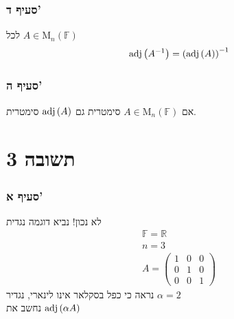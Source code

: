 \documentclass[12pt, titlepage]{article}
\begin{document}
\section*{סעיף ד'}
לכל $A\in \mathrm{M}_n\left(\mathbb{F}\right)$
\[
    \mathrm{adj}\left(A^{-1}\right) = \left(\mathrm{adj}\left(A\right)\right)^{-1}
\]
\section*{סעיף ה'}
אם $A\in \mathrm{M}_n \left(\mathbb{F}\right)$ סימטרית גם $\mathrm{adj}\left(A\right)$ סימטרית.
\part*{תשובה 3}
\section*{סעיף א'}
לא נכון! נביא דוגמה נגדית
\begin{gather*}
    \mathbb{F}= \mathbb{R}\\
    n = 3\\
A= \begin{pmatrix}
    1 & 0 & 0 \\
    0 & 1 & 0 \\
    0 & 0 & 1
\end{pmatrix}
\end{gather*}
נראה כי כפל בסקלאר אינו לינארי, נגדיר $\alpha = 2$ \\
נחשב את $\mathrm{adj}\left(\alpha A\right)$
\end{document}
